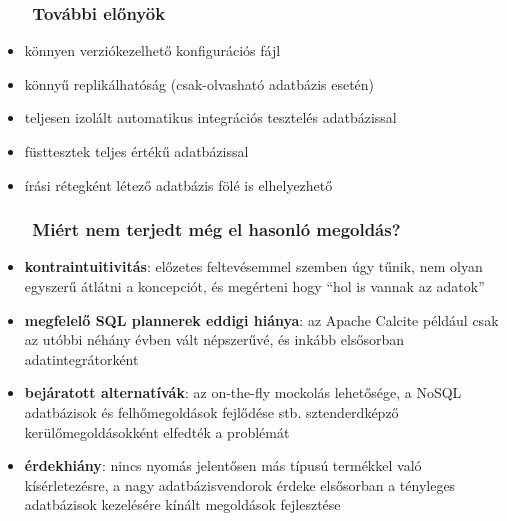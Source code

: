 \documentclass[
]{beamer}
\newcommand{\slidetitle}[2]{\frametitle{{\small #1 ~ \ding{226} ~ } \normalsize \textbf{#2} }}
\begin{document}
\begin{frame}
    \slidetitle{\sectionshorttitle}{További előnyök}
    
    \begin{itemize}
        \setlength\itemsep{1em}
        \item könnyen verziókezelhető konfigurációs fájl
        \item könnyű replikálhatóság (csak-olvasható adatbázis esetén)
        \item teljesen izolált automatikus integrációs tesztelés adatbázissal
        \item füsttesztek teljes értékű adatbázissal
        \item írási rétegként létező adatbázis fölé is elhelyezhető
    \end{itemize}
\end{frame}

\begin{frame}
    \slidetitle{\sectionshorttitle}{Miért nem terjedt még el hasonló megoldás?}

    \begin{itemize}
        \setlength\itemsep{1em}
        \item \textbf{kontraintuitivitás}:
            előzetes feltevésemmel szemben úgy tűnik, nem olyan egyszerű átlátni a koncepciót,
            és megérteni hogy ``hol is vannak az adatok''
        \item \textbf{megfelelő SQL plannerek eddigi hiánya}:
            az Apache Calcite például csak az utóbbi néhány évben vált népszerűvé,
            és inkább elsősorban adatintegrátorként
        \item \textbf{bejáratott alternatívák}:
            az on-the-fly mockolás lehetősége,
            a NoSQL adatbázisok és felhőmegoldások fejlődése stb.
            sztenderdképző kerülőmegoldásokként elfedték a problémát
        \item \textbf{érdekhiány}:
            nincs nyomás jelentősen más típusú termékkel való kísérletezésre,
            a nagy adatbázisvendorok érdeke elsősorban
            a tényleges adatbázisok kezelésére kínált megoldások fejlesztése
    \end{itemize}
\end{frame}
\end{document}
